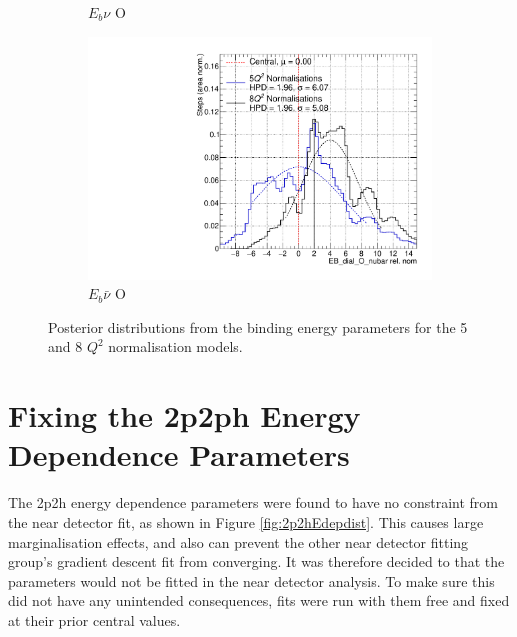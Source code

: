 \begin{figure}
\begin{subfigure}{.48\textwidth}
  \caption{$E_{b}\nu$ O}
\end{subfigure}
\begin{subfigure}{.48\textwidth}
  \centering
  \includegraphics[width=0.73\linewidth]{figs/Q2_EB_dial_O_nubar}
  \caption{$E_{b}\bar{\nu}$ O}
\end{subfigure}
\caption{Posterior distributions from the binding energy parameters for the 5 and 8 $Q^2$ normalisation models.}
\label{fig:Q2Ebdata}
\end{figure}

\section{Fixing the 2p2ph Energy Dependence Parameters}

The 2p2h energy dependence parameters were found to have no constraint from the near detector fit, as shown in Figure \ref{fig:2p2hEdepdist}. This causes large marginalisation effects, and also can prevent the other near detector fitting group's gradient descent fit from converging. It was therefore decided to that the parameters would not be fitted in the near detector analysis. 
To make sure this did not have any unintended consequences, fits were run with them free and fixed at their prior central values.

